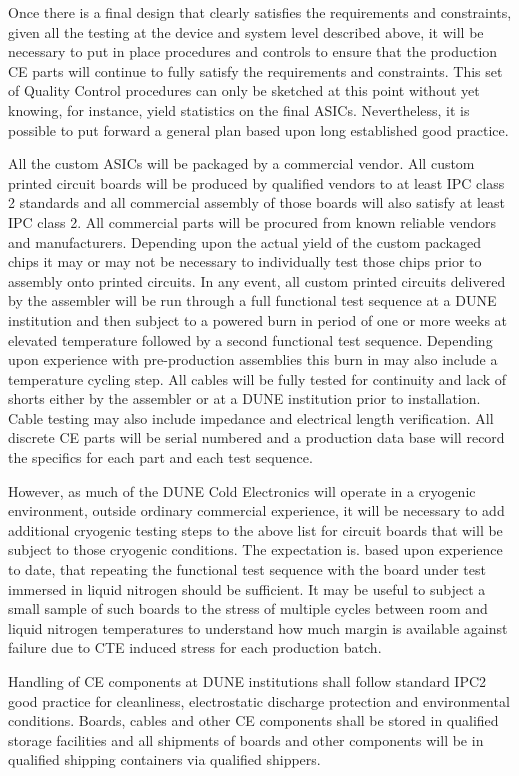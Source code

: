 
Once there is a final design that clearly satisfies the requirements and constraints, given all the testing at the device and system level described above, it will be necessary to put in place procedures and controls to ensure that the production CE parts will continue to fully satisfy the requirements and constraints. This set of Quality Control procedures can only be sketched at this point without yet knowing, for instance, yield statistics on the final ASICs. Nevertheless, it is possible to put forward a general plan based upon long established good practice.

All the custom ASICs will be packaged by a commercial vendor. All custom printed circuit boards will be produced by qualified vendors to at least IPC class 2 standards and all commercial assembly of those boards will also satisfy at least IPC class 2. All commercial parts will be procured from known reliable vendors and manufacturers. Depending upon the actual yield of the custom packaged chips it may or may not be necessary to individually test those chips prior to assembly onto printed circuits. In any event, all custom printed circuits delivered by the assembler will be run through a full functional test sequence at a DUNE institution and then subject to a powered burn in period of one or more weeks at elevated temperature followed by a second functional test sequence. Depending upon experience with pre-production assemblies this burn in may also include a temperature cycling step. All cables will be fully tested for continuity and lack of shorts either by the assembler or at a DUNE institution prior to installation. Cable testing may also include impedance and electrical length verification. All discrete CE parts will be serial numbered and a production data base will record the specifics for each part and each test sequence.

However, as much of the DUNE Cold Electronics will operate in a cryogenic environment, outside ordinary commercial experience, it will be necessary to add additional cryogenic testing steps to the above list for circuit boards that will be subject to those cryogenic conditions. The expectation is. based upon experience to date, that repeating the functional test sequence with the board under test immersed in liquid nitrogen should be sufficient. It may be useful to subject a small sample of such boards to the stress of multiple cycles between room and liquid nitrogen temperatures to understand how much margin is available against failure due to CTE induced stress for each production batch.

Handling of CE components at DUNE institutions shall follow standard IPC2 good practice for cleanliness, electrostatic discharge protection and environmental conditions. Boards, cables and other CE components shall be stored in qualified storage facilities and all shipments of boards and other components will be in qualified shipping containers via qualified shippers.
